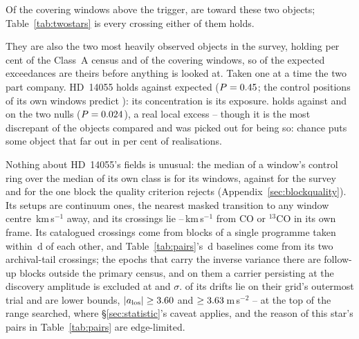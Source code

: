 Of the \WuNWinExc{} covering windows above the trigger, \TwNWinExcTwoWord{}
are toward these two objects; Table~\ref{tab:twostars} is every crossing
either of them holds.

They are also the two most heavily observed objects in the survey, holding
\TwWinASharePct{} per cent of the Class~A census and \TwNWinTwo{} of the
\WuNWin{} covering windows, so \TwExpTwo{} of the \WuExpWin{} expected
exceedances are theirs before anything is looked at. Taken one at a time the
two part company. HD~14055 holds \TwNExcHD{} against \TwExpHD{} expected
($P=0.45$; the control positions of its own windows predict
\TwExpCtrlHD): its concentration is its exposure. \BkAlmaName{} holds
\TwNExcJx{} against \TwExpJx{} and \TwExpCtrlJx{} on the two nulls
($P=0.024$), a real local excess -- though it is the most
discrepant of the \TwLookNStar{} objects compared and was picked out for
being so: chance puts some object that far out in \TwLookPct{} per cent of
realisations.

Nothing about HD~14055's fields is unusual: the median of a window's control
ring over the median of its own class is \TwRingQHD{} for its windows,
against \TwRingQSurv{} for the survey and \TwBlockQMax{} for the one block
the quality criterion rejects (Appendix~\ref{sec:blockquality}). Its setups
are continuum ones, the nearest masked transition to any window centre
\TwHDCenMinKms\,km\,s$^{-1}$ away, and its crossings lie
\TwHDMaskLo--\TwHDMaskHi\,km\,s$^{-1}$ from CO or $^{13}$CO in its own frame. Its \TwHDNBlockCensusWord{} catalogued crossings come from blocks of a single
programme taken within \TwPairCensusSpanD\,d of each other, and
Table~\ref{tab:pairs}'s \TwPairSpanD\,d baselines come from its two
archival-tail crossings; the \TwHDNDeep{} epochs that carry the inverse
variance there are follow-up blocks outside the primary census, and on
them a carrier persisting at the discovery amplitude is excluded at
\TwHDExclA{} and \TwHDExclB$\sigma$. \TwHDNEdgeWordCap{} of its drifts lie on their grid's
outermost trial and are lower bounds, $|a_{\rm los}|\ge3.60$ and
$\ge3.63$\,m\,s$^{-2}$ -- at the top of the range searched, where
\S\ref{sec:statistic}'s caveat applies, and the reason \TwNPairEdgeHDWord{} of this
star's pairs in Table~\ref{tab:pairs} are edge-limited.

